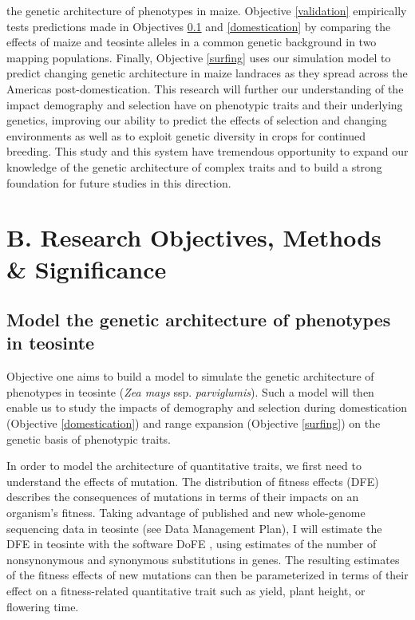 the genetic architecture of phenotypes in maize.  Objective \ref{validation} empirically tests  predictions made in Objectives \ref{modeling} and \ref{domestication} by comparing the effects of maize and teosinte alleles in a common genetic background in two mapping populations. Finally, Objective \ref{surfing} uses our simulation model to predict changing genetic architecture in maize landraces as they spread across the Americas post-domestication. This research will further our understanding of the impact demography and selection have on phenotypic traits and their underlying genetics, improving our ability to predict the effects of selection and changing environments as well as to exploit genetic diversity in crops for continued breeding. This study and this system have tremendous opportunity to expand our knowledge of the genetic architecture of complex traits and to build a strong foundation for future studies in this direction.


\section*{B. Research Objectives, Methods \& Significance}

\renewcommand\thesubsection{\Roman {subsection}.}

\subsection{Model the genetic architecture of phenotypes in teosinte}
\label{modeling}
Objective one aims to build a model to simulate the genetic architecture of phenotypes in teosinte (\emph{Zea mays} ssp. \emph{parviglumis}). Such a model will then enable us to study the impacts of demography and selection during domestication (Objective \ref{domestication}) and range expansion (Objective \ref{surfing}) on the genetic basis of phenotypic traits.

In order to model the architecture of quantitative traits, we first need to understand the effects of mutation.  The distribution of fitness effects (DFE) describes the consequences of mutations in terms of their impacts on an organism's fitness. Taking advantage of published \citep{Chia:2012} and new whole-genome sequencing data in teosinte (see Data Management Plan), I will estimate the DFE in teosinte with the software DoFE \citep{Keightley:2007hq, Stoletzki:2011}, using estimates of the number of nonsynonymous and synonymous substitutions in genes.
The resulting estimates of the fitness effects of new mutations can then be parameterized in terms of their effect on a fitness-related quantitative trait \citep{Keightley:1988, eyre-walker:2010} such as yield, plant height, or flowering time.

